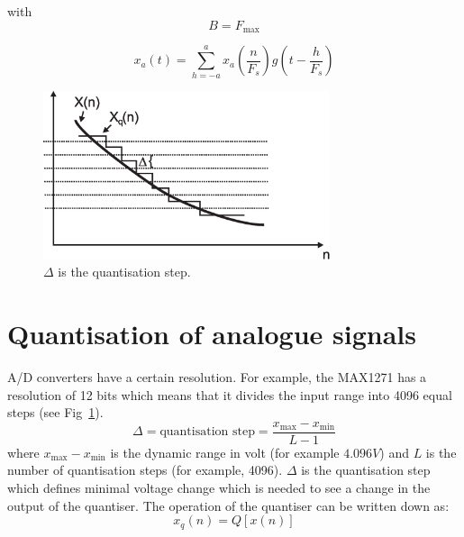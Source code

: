 \documentclass[12pt,a4paper]{article}
\begin{document}
with
\begin{equation}
B = F_{\mbox{max}}
\end{equation}

\begin{equation}
x_{a}(t) = \sum_{h= -a}^{a}x_{a}(\frac{n}{F_s})g(t - \frac{h}{F_s})
\end{equation}




\begin{figure}[!hbt]
\begin{center}
\mbox{\includegraphics[width=0.75\textwidth]{quant_overv}}
\end{center}
\caption{$\Delta$ is the quantisation step.
\label{quant_overv}}
\end{figure}



\section{Quantisation of analogue signals}
A/D converters have a certain resolution. For example, the MAX1271 has a
resolution of 12 bits which means that it divides the input range into
4096 equal steps (see Fig~\ref{quant_overv}).
\begin{equation}
\Delta = \mbox{quantisation step} = 
\frac{x_{\mbox{max}} - x_{\mbox{min}}}{L - 1}
\end{equation}
where $x_{\mbox{max}} - x_{\mbox{min}}$ is the dynamic range in volt
(for example $4.096V$) and $L$ is the number of quantisation steps
(for example, 4096). $\Delta$ is the quantisation step which defines
minimal voltage change which is needed to see a change in the output
of the quantiser. The operation of the quantiser can be written down
as:
\begin{equation}
x_{q}(n) = Q[x(n)]
\end{equation}
\end{document}
